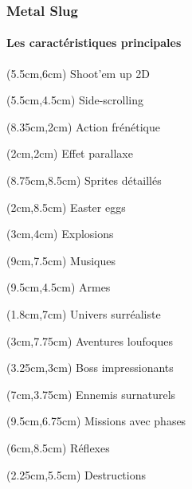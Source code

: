 \begin{frame}
	
	\frametitle{Metal Slug}
	\framesubtitle{Les caractéristiques principales}
	
	{
		\begin{textblock*}{5cm}(5.5cm,6cm)
			{\LARGE Shoot'em up 2D}
		\end{textblock*}
		\begin{textblock*}{5cm}(5.5cm,4.5cm)
			{\LARGE Side-scrolling}
		\end{textblock*}
		\begin{textblock*}{5cm}(8.35cm,2cm)
			{\LARGE Action frénétique}
		\end{textblock*}
		\begin{textblock*}{5cm}(2cm,2cm)
			{\LARGE Effet parallaxe}
		\end{textblock*}
		\begin{textblock*}{5cm}(8.75cm,8.5cm)
			{\LARGE Sprites détaillés}
		\end{textblock*}
		\begin{textblock*}{5cm}(2cm,8.5cm)
			{\LARGE Easter eggs}
		\end{textblock*}
	
		\begin{textblock*}{5cm}(3cm,4cm)
			{\large Explosions}
		\end{textblock*}
		\begin{textblock*}{5cm}(9cm,7.5cm)
			{\large Musiques}
		\end{textblock*}
		\begin{textblock*}{5cm}(9.5cm,4.5cm)
			{\large Armes}
		\end{textblock*}
	
		\begin{textblock*}{5cm}(1.8cm,7cm)
			{\small Univers surréaliste}
		\end{textblock*}
		\begin{textblock*}{5cm}(3cm,7.75cm)
			{\small Aventures loufoques}
		\end{textblock*}
		\begin{textblock*}{5cm}(3.25cm,3cm)
			{\small Boss impressionants}
		\end{textblock*}
		\begin{textblock*}{5cm}(7cm,3.75cm)
			{\small Ennemis surnaturels}
		\end{textblock*}
	
		\begin{textblock*}{5cm}(9.5cm,6.75cm)
			{\scriptsize Missions avec phases}
		\end{textblock*}
		\begin{textblock*}{5cm}(6cm,8.5cm)
			{\scriptsize Réflexes}
		\end{textblock*}
		\begin{textblock*}{5cm}(2.25cm,5.5cm)
			{\scriptsize Destructions}
		\end{textblock*}
	}
	
\end{frame}
